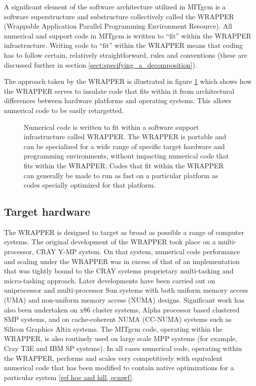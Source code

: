 A significant element of the software architecture utilized in MITgcm
is a software superstructure and substructure collectively called the
WRAPPER (Wrappable Application Parallel Programming Environment
Resource). All numerical and support code in MITgcm is written to
``fit'' within the WRAPPER infrastructure. Writing code to ``fit''
within the WRAPPER means that coding has to follow certain, relatively
straightforward, rules and conventions (these are discussed further in
section \ref{sect:specifying_a_decomposition}).

The approach taken by the WRAPPER is illustrated in figure
\ref{fig:fit_in_wrapper} which shows how the WRAPPER serves to
insulate code that fits within it from architectural differences
between hardware platforms and operating systems. This allows
numerical code to be easily retargetted.


\begin{figure}
\begin{center}
\end{center}
\caption{
Numerical code is written to fit within a software support
infrastructure called WRAPPER. The WRAPPER is portable and
can be specialized for a wide range of specific target hardware and 
programming environments, without impacting numerical code that fits
within the WRAPPER. Codes that fit within the WRAPPER can generally be
made to run as fast on a particular platform as codes specially 
optimized for that platform.}
\label{fig:fit_in_wrapper}
\end{figure}

\subsection{Target hardware}
\label{sect:target_hardware}

The WRAPPER is designed to target as broad as possible a range of
computer systems.  The original development of the WRAPPER took place
on a multi-processor, CRAY Y-MP system. On that system, numerical code
performance and scaling under the WRAPPER was in excess of that of an
implementation that was tightly bound to the CRAY systems proprietary
multi-tasking and micro-tasking approach. Later developments have been
carried out on uniprocessor and multi-processor Sun systems with both
uniform memory access (UMA) and non-uniform memory access (NUMA)
designs.  Significant work has also been undertaken on x86 cluster
systems, Alpha processor based clustered SMP systems, and on
cache-coherent NUMA (CC-NUMA) systems such as Silicon Graphics Altix
systems.  The MITgcm code, operating within the WRAPPER, is also
routinely used on large scale MPP systems (for example, Cray T3E and
IBM SP systems). In all cases numerical code, operating within the
WRAPPER, performs and scales very competitively with equivalent
numerical code that has been modified to contain native optimizations
for a particular system \ref{ref hoe and hill, ecmwf}.

